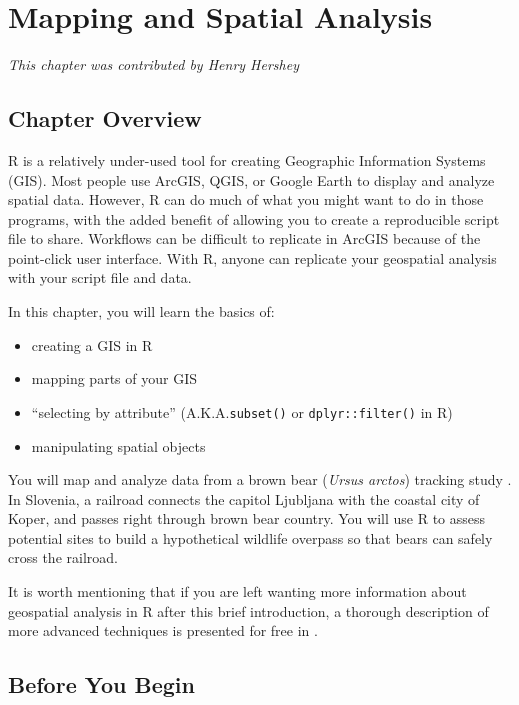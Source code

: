 \documentclass[]{book}
\providecommand{\tightlist}{%
  \setlength{\itemsep}{0pt}\setlength{\parskip}{0pt}}
\begin{document}
\hypertarget{ch6}{%
\chapter{Mapping and Spatial Analysis}\label{ch6}}

\emph{This chapter was contributed by Henry Hershey}

\hypertarget{ch6overview}{%
\section{Chapter Overview}\label{ch6overview}}

R is a relatively under-used tool for creating Geographic Information Systems (GIS). Most people use ArcGIS, QGIS, or Google Earth to display and analyze spatial data. However, R can do much of what you might want to do in those programs, with the added benefit of allowing you to create a reproducible script file to share. Workflows can be difficult to replicate in ArcGIS because of the point-click user interface. With R, anyone can replicate your geospatial analysis with your script file and data.

In this chapter, you will learn the basics of:

\begin{itemize}
\tightlist
\item
  creating a GIS in R
\item
  mapping parts of your GIS
\item
  ``selecting by attribute'' (A.K.A.\texttt{subset()} or \texttt{dplyr::filter()} in R)
\item
  manipulating spatial objects
\end{itemize}

You will map and analyze data from a brown bear (\emph{Ursus arctos}) tracking study \citep{bears-cite}. In Slovenia, a railroad connects the capitol Ljubljana with the coastal city of Koper, and passes right through brown bear country. You will use R to assess potential sites to build a hypothetical wildlife overpass so that bears can safely cross the railroad.

It is worth mentioning that if you are left wanting more information about geospatial analysis in R after this brief introduction, a thorough description of more advanced techniques is presented for free in \citet{geospatR-cite}.

\hypertarget{ch6beforeyoubegin}{%
\section{Before You Begin}\label{ch6beforeyoubegin}}
\end{document}
